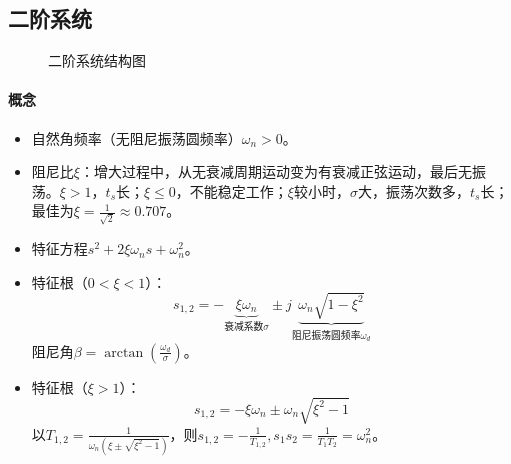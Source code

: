 \documentclass[
12pt, %
a4paper, 
oneside, %
headinclude,footinclude, %
]{scrartcl}
\begin{document}
\subsection[二阶系统]{二阶系统}
\begin{figure}[H]
\centering 
{}
\caption{二阶系统结构图}
\end{figure}
\paragraph{概念}
\begin{itemize}
\item 自然角频率（无阻尼振荡圆频率）$ \omega_n > 0 $。
\item 阻尼比$ \xi $：增大过程中，从无衰减周期运动变为有衰减正弦运动，最后无振荡。$ \xi > 1 $，$ t_s $长；$ \xi \leq 0 $，不能稳定工作；$ \xi $较小时，$ \sigma $大，振荡次数多，$ t_s $长；最佳为$ \xi = \frac{1}{\sqrt{2}} \approx 0.707 $。
\item 特征方程$ s^2 + 2 \xi \omega_n s + \omega_n^2 $。
\item 特征根（$ 0 < \xi < 1 $）：
$$ s_{1, 2} = -\underbrace{\xi \omega_n}_{\text{衰减系数}\sigma} \pm j \underbrace{\omega_n \sqrt{1 - \xi^2}}_{\text{阻尼振荡圆频率}\omega_d} $$
阻尼角$ \beta = \arctan(\frac{\omega_d}{\sigma}) $。
\item 特征根（$ \xi > 1 $）：
$$ s_{1, 2} = -\xi \omega_n \pm \omega_n \sqrt{\xi^2 - 1} $$
以$ T_{1, 2} = \frac{1}{\omega_n(\xi \pm \sqrt{\xi^2 - 1})} $，则$ s_{1, 2} = -\frac{1}{T_{1, 2}}, s_1 s_2 = \frac{1}{T_1 T_2} = \omega_n^2 $。
\end{itemize}
\end{document}
